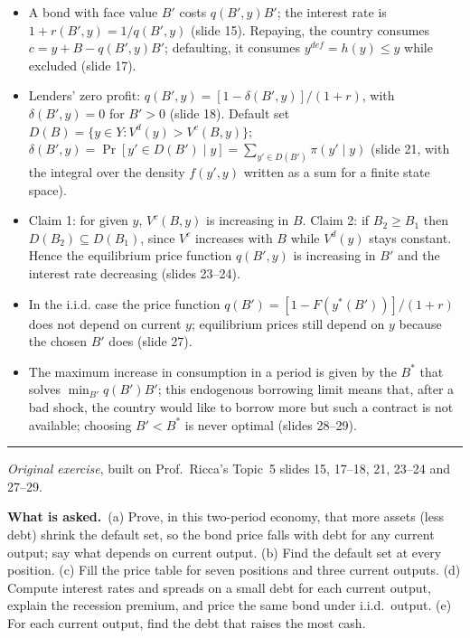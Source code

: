 \documentclass[11pt,a4paper]{article}
\newcommand{\asked}{\par\medskip\noindent\textbf{What is asked.}~}
\providecommand{\tightlist}{\setlength{\itemsep}{0pt}\setlength{\parskip}{0pt}}
\newcommand{\stmtend}{\par\endgroup\nopagebreak\noindent\rule{\linewidth}{0.4pt}\par\medskip}
\begin{document}
\begin{itemize}
\tightlist
\item
  A bond with face value \(B'\) costs \(q(B', y)B'\); the interest rate is
  \(1 + r(B', y) = 1/q(B', y)\) (slide 15). Repaying, the country consumes
  \(c = y + B - q(B', y)B'\); defaulting, it consumes \(y^{def} = h(y) \le y\) while excluded (slide
  17).
\item
  Lenders' zero profit: \(q(B', y) = [1 - \delta(B', y)]/(1 + r)\), with \(\delta(B', y) = 0\) for
  \(B' > 0\) (slide 18). Default set \(D(B) = \{y \in Y : V^d(y) > V^c(B, y)\}\);
  \(\delta(B', y) = \Pr[y' \in D(B') \mid y] = \sum_{y' \in D(B')} \pi(y' \mid y)\) (slide 21, with
  the integral over the density \(f(y', y)\) written as a sum for a finite state space).
\item
  Claim 1: for given \(y\), \(V^c(B, y)\) is increasing in \(B\). Claim 2: if \(B_2 \ge B_1\) then
  \(D(B_2) \subseteq D(B_1)\), since \(V^c\) increases with \(B\) while \(V^d(y)\) stays constant.
  Hence the equilibrium price function \(q(B', y)\) is increasing in \(B'\) and the interest rate
  decreasing (slides 23--24).
\item
  In the i.i.d. case the price function \(q(B') = [1 - F(y^*(B'))]/(1 + r)\) does not depend on
  current \(y\); equilibrium prices still depend on \(y\) because the chosen \(B'\) does (slide 27).
\item
  The maximum increase in consumption in a period is given by the \(B^*\) that solves
  \(\min_{B'} q(B')B'\); this endogenous borrowing limit means that, after a bad shock, the country
  would like to borrow more but such a contract is not available; choosing \(B' < B^*\) is never
  optimal (slides 28--29).
\end{itemize}
\stmtend

\noindent\emph{Original exercise}, built on Prof.\ Ricca's Topic~5 slides 15, 17--18, 21, 23--24 and 27--29.

\asked (a) Prove, in this two-period economy, that more assets (less debt) shrink the default set, so the bond price falls with debt for any current
output; say what depends on current output. (b) Find the default set at every position. (c) Fill the price table for seven positions and three current
outputs. (d) Compute interest rates and spreads on a small debt for each current output, explain the recession premium, and price the same bond under
i.i.d.\ output. (e) For each current output, find the debt that raises the most cash.
\end{document}
